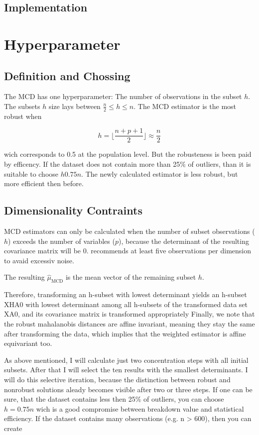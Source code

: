 \subsection*{Implementation}


\section*{Hyperparameter}
\subsection*{Definition and Chossing}
The MCD has one hyperparameter: The number of observations in the subset $h$.
The subsets $h$ size lays between $\frac{n}{2} \le h \le n$. 
The MCD estimator is the most robust when 

\begin{equation}
    h = \lfloor \frac{n+p+1}{2} \rfloor \approx \frac{n}{2}
\end{equation}

wich corresponds to 0.5 at the population level. But the robusteness is been paid by efficency. 
If the dataset does not contain more than 25\% of outliers, than it is suitable to choose $h  0.75n$. \citep[p.217]{rousseeuw1999fast}
The newly calculated estimator is less robust, but more efficient then before. 


\subsection*{Dimensionality Contraints}
MCD estimators can only be calculated when the number of subset observations ($h$) exceeds the number of variables ($p$), because the determinant of the resulting covariance matrix will be 0. 
\citet{hubert2018minimum} recommends at least five observations per dimension to avaid excessiv noise. 



The resulting $\hat{\mu}_{\text{MCD}}$ is the mean vector of the remaining subset $h$. 


Therefore, transforming an h-subset with lowest determinant yields an h-subset XHA0 with lowest determinant among all
h-subsets of the transformed data set XA0, and its covariance matrix is transformed appropriately
Finally, we note that the robust mahalanobis distances are affine invariant, meaning they stay the same after transforming the data, which implies that the weighted
estimator is affine equivariant too.


As above mentioned, I will calculate just two concentration steps with all initial subsets.
After that I will select the ten results with the smallest determinants.
I will do this selective iteration, because the distinction between robust and nonrobust solutions aleady becomes visible after two or three steps.  
If one can be sure, that the dataset contains less then 25\% of outliers, you can choose $h=0.75n$ wich is a good compromise between breakdown value and statistical efficiency.
If the dataset contains many observations (e.g. n > 600), then you can create

